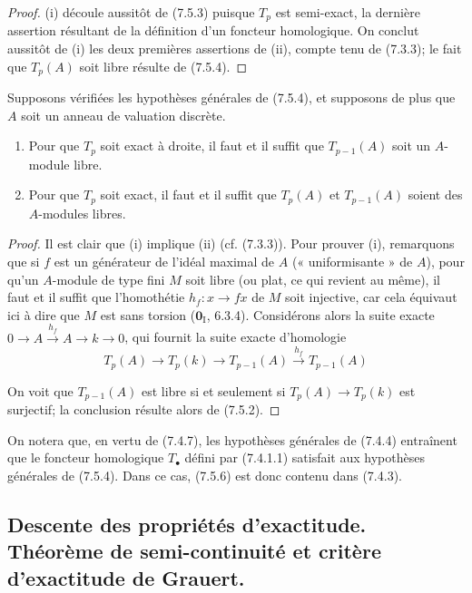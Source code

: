\begin{proof}
(i) découle aussitôt de (7.5.3) puisque $T_p$ est semi-exact, la dernière
assertion résultant de la définition d'un foncteur homologique. On conclut
aussitôt de (i) les deux premières assertions de (ii), compte tenu de (7.3.3);
le fait que $T_p(A)$ soit libre résulte de (7.5.4).
\end{proof}

\begin{corollary}[7.5.6]
Supposons vérifiées les hypothèses générales de \textup{(7.5.4)}, et supposons de plus
que $A$ soit un anneau de valuation discrète.
\begin{enumerate}
  \item[\textup{(i)}] Pour que $T_p$ soit exact à droite, il faut et il suffit que
    $T_{p-1}(A)$ soit un $A$-module libre.
  \item[\textup{(ii)}] Pour que $T_p$ soit exact, il faut et il suffit que $T_p(A)$ et
    $T_{p-1}(A)$ soient des $A$-modules libres.
\end{enumerate}
\end{corollary}

\begin{proof}
Il est clair que (i) implique (ii) (cf. (7.3.3)). Pour prouver (i), remarquons
que si $f$ est un générateur de l'idéal maximal de $A$ (« uniformisante » de
$A$), pour qu'un $A$-module de type fini $M$ soit libre (ou plat, ce qui revient
au même), il faut et il suffit que l'homothétie $h_f:x\to fx$ de $M$ soit
injective, car cela équivaut ici à dire que $M$ est sans torsion
($\mathbf{0}_{\mathrm I}$, 6.3.4). Considérons alors la suite exacte
$0\longrightarrow A\xrightarrow{h_f}A\longrightarrow k\longrightarrow0$,
qui fournit la suite exacte d'homologie
\[
  T_p(A)
  \longrightarrow T_p(k)
  \longrightarrow T_{p-1}(A)
  \xrightarrow{h_f}T_{p-1}(A)
\]

On voit que $T_{p-1}(A)$ est libre si et seulement si
$T_p(A)\to T_p(k)$ est surjectif; la conclusion résulte alors de (7.5.2).
\end{proof}

\begin{remark}[7.5.7]
On notera que, en vertu de (7.4.7), les hypothèses générales de (7.4.4)
entraînent que le foncteur homologique $T_\bullet$ défini par (7.4.1.1)
satisfait aux hypothèses générales de (7.5.4). Dans ce cas, (7.5.6) est donc
contenu dans (7.4.3).
\end{remark}

\subsection{Descente des propriétés d'exactitude. Théorème de semi-continuité
et critère d'exactitude de Grauert.}
\label{subsection:III.7.6.fr}

